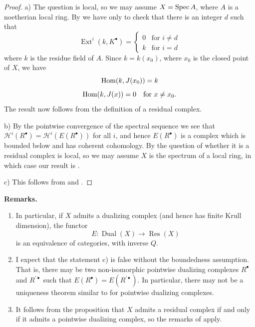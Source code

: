 \begin{proof}
a) The question is local, so we may assume $X=\operatorname{Spec} A$, where $A$ is a noetherian local ring. By  we have only to check that there is an integer $d$ such that
\[
\operatorname{Ext}^{i}(k,K^{\bullet}) = \begin{cases} 0 & \text{for } i\neq d \\ k & \text{for } i = d \end{cases}
\]
where $k$ is the residue field of $A$. Since $k=k(x_0)$, where $x_0$ is the closed point of $X$, we have
\[
\operatorname{Hom}(k, J(x_0)) = k
\]
\[
\operatorname{Hom}(k, J(x)) = 0 \quad\text{for } x\neq x_0.
\]
The result now follows from the definition of a residual complex.

\noindent b) By the pointwise convergence of the spectral sequence  we see that $\mathcal{H}^{i}(R^{\bullet}) = \mathcal{H}^{i}(E(R^{\bullet}))$ for all $i$, and hence $E(R^{\bullet})$ is a complex which is bounded below and has coherent cohomology. By  the question of whether it is a residual complex is local, so we may assume $X$ is the spectrum of a local ring, in which case our result is .

\noindent c) This follows from  and .
\end{proof}

\par\medskip\noindent\textbf{Remarks.}
\begin{enumerate}
\item In particular, if $X$ admits a dualizing complex (and hence has finite Krull dimension), the functor
\[
E\colon \operatorname{Dual}(X)\longrightarrow \operatorname{Res}(X)
\]
is an equivalence of categories, with inverse $Q$.
\item I expect that the statement c) is false without the boundedness assumption. That is, there may be two non-isomorphic pointwise dualizing complexes $R^\bullet$ and $R^{\prime\bullet}$ such that $E(R^\bullet)=E(R^{\prime\bullet})$. In particular, there may not be a uniqueness theorem similar to  for pointwise dualizing complexes.
\item It follows from the proposition that $X$ admits a residual complex if and only if it admits a pointwise dualizing complex, so the remarks of  apply.
\end{enumerate}
\par\medskip

